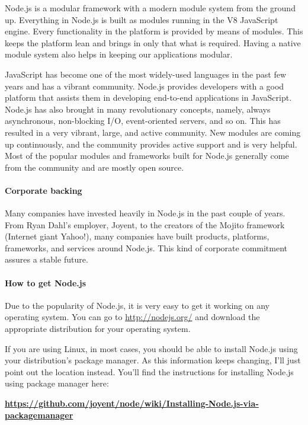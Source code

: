 Node.js is a modular framework with a modern module system from the ground
up. Everything in Node.js is built as modules running in the V8 JavaScript engine.
Every functionality in the platform is provided by means of modules. This keeps
the platform lean and brings in only that what is required. Having a native module
system also helps in keeping our applications modular.

JavaScript has become one of the most widely-used languages in the past few years
and has a vibrant community. Node.js provides developers with a good platform
that assists them in developing end-to-end applications in JavaScript. Node.js has
also brought in many revolutionary concepts, namely, always asynchronous,
non-blocking I/O, event-oriented servers, and so on. This has resulted in a very
vibrant, large, and active community. New modules are coming up continuously,
and the community provides active support and is very helpful. Most of the popular
modules and frameworks built for Node.js generally come from the community and
are mostly open source.

\paragraph*{Corporate backing}
\hfill \break
Many companies have invested heavily in Node.js in the past couple of years. From
Ryan Dahl's employer, Joyent, to the creators of the Mojito framework (Internet giant
Yahoo!), many companies have built products, platforms, frameworks, and services
around Node.js. This kind of corporate commitment assures a stable future.

\paragraph*{How to get Node.js}
\hfill \break
Due to the popularity of Node.js, it is very easy to get it working on any operating
system. You can go to \href{http://nodejs.org/}{http://nodejs.org/} and download the appropriate
distribution for your operating system. 

If you are using Linux, in most cases, you should be able to install Node.js using
your distribution's package manager. As this information keeps changing, I'll just
point out the location instead. You'll find the instructions for installing Node.js using
package manager here:

\textbf{\href{https://github.com/joyent/node/wiki/Installing-Node.js-via-packagemanager}{https://github.com/joyent/node/wiki/Installing-Node.js-via-packagemanager}}


